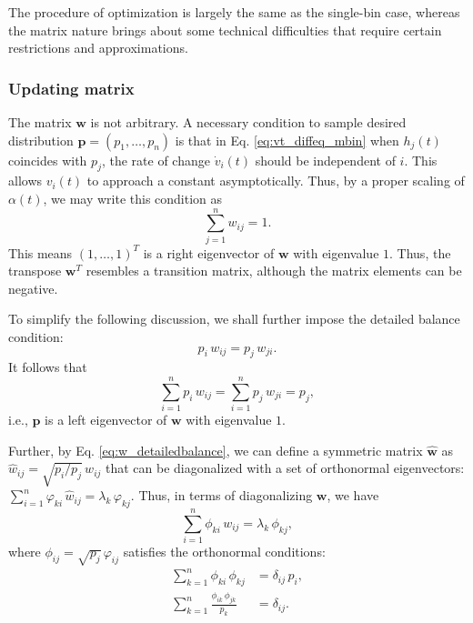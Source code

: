 \documentclass[reprint]{revtex4-1}
\begin{document}
The procedure of optimization is largely
the same as the single-bin case,
whereas the matrix nature brings about
some technical difficulties that require
certain restrictions and approximations.



\subsubsection{Updating matrix}



The matrix $\mathbf w$ is not arbitrary.
%
A necessary condition to sample desired distribution
$\mathbf p = (p_1, \dots, p_n)$
is that in Eq. \eqref{eq:vt_diffeq_mbin}
when $h_j(t)$ coincides with $p_j$,
the rate of change $\dot v_i(t)$
should be independent of $i$.
%
This allows $v_i(t)$ to approach a constant
asymptotically.
%
Thus, by a proper scaling of $\alpha(t)$,
we may write this condition as
%
\begin{equation}
  \sum_{j = 1}^n w_{ij} = 1.
  \label{eq:w_sumj}
\end{equation}
%
This means $(1, \dots, 1)^T$
is a right eigenvector of $\mathbf w$
with eigenvalue $1$.
%
Thus, the transpose $\mathbf w^T$
resembles a transition matrix,
although the matrix elements can be negative.



To simplify the following discussion,
we shall further impose the
detailed balance condition:
%
\begin{equation}
  p_i \, w_{ij} = p_j \, w_{ji}.
  \label{eq:w_detailedbalance}
\end{equation}
%
It follows that
\begin{equation}
  \sum_{i = 1}^n p_i \, w_{ij}
  =
  \sum_{i = 1}^n p_j \, w_{ji}
  = p_j,
  \label{eq:w_balance}
\end{equation}
%
i.e., $\mathbf p$ is a left eigenvector of
$\mathbf w$ with eigenvalue $1$.



Further, by Eq. \eqref{eq:w_detailedbalance},
we can define a symmetric matrix $\hat{\mathbf w}$
as $\hat w_{ij} = \sqrt{p_i/p_j} \, w_{ij}$
that can be diagonalized
with a set of orthonormal eigenvectors:
%
$\sum_{i = 1}^n \varphi_{ki} \, \hat w_{ij} = \lambda_k \, \varphi_{kj}$.
%
Thus,
in terms of diagonalizing $\mathbf w$, we have
\begin{equation}
  \sum_{i = 1}^n \phi_{ki} \, w_{ij} = \lambda_k \, \phi_{kj},
  \label{eq:eig_w}
\end{equation}
where
$\phi_{ij} = \sqrt{p_j} \, \varphi_{ij}$ satisfies
the orthonormal conditions:
%
\begin{align}
\sum_{k = 1}^n \phi_{ki} \, \phi_{kj}
&= \delta_{ij} \, p_i,
\label{eq:eig_orthonormal_cols}
\\
\sum_{k = 1}^n \frac{ \phi_{ik} \, \phi_{jk} }{ p_k }
&= \delta_{ij}.
\label{eq:eig_orthonormal_rows}
\end{align}
\end{document}
